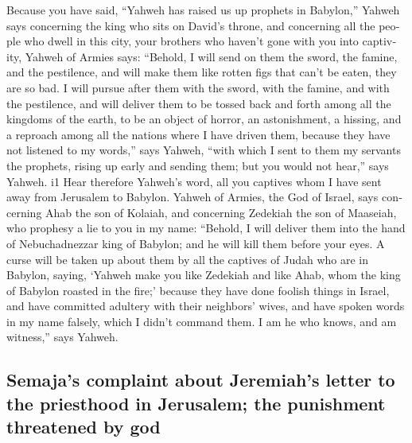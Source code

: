 \begin{paracol}{2}
\begin{otherlanguage}{english}
 Because you have said, ``Yahweh has raised us up
prophets in Babylon,''  Yahweh says concerning the king
who sits on David's throne, and concerning all the people who dwell in
this city, your brothers who haven't gone with you into captivity,
 Yahweh of Armies says: ``Behold, I will send on them the
sword, the famine, and the pestilence, and will make them like rotten
figs that can't be eaten, they are so bad.  I will pursue
after them with the sword, with the famine, and with the pestilence, and
will deliver them to be tossed back and forth among all the kingdoms of
the earth, to be an object of horror, an astonishment, a hissing, and a
reproach among all the nations where I have driven them, 
because they have not listened to my words,'' says Yahweh, ``with which
I sent to them my servants the prophets, rising up early and sending
them; but you would not hear,'' says Yahweh. i1  Hear
therefore Yahweh's word, all you captives whom I have sent away from
Jerusalem to Babylon.  Yahweh of Armies, the God of
Israel, says concerning Ahab the son of Kolaiah, and concerning Zedekiah
the son of Maaseiah, who prophesy a lie to you in my name: ``Behold, I
will deliver them into the hand of Nebuchadnezzar king of Babylon; and
he will kill them before your eyes.  A curse will be
taken up about them by all the captives of Judah who are in Babylon,
saying, `Yahweh make you like Zedekiah and like Ahab, whom the king of
Babylon roasted in the fire;'  because they have done
foolish things in Israel, and have committed adultery with their
neighbors' wives, and have spoken words in my name falsely, which I
didn't command them. I am he who knows, and am witness,'' says Yahweh.

\hypertarget{semajas-complaint-about-jeremiahs-letter-to-the-priesthood-in-jerusalem-the-punishment-threatened-by-god}{%
\subsection{Semaja's complaint about Jeremiah's letter to the priesthood
in Jerusalem; the punishment threatened by
god}\label{semajas-complaint-about-jeremiahs-letter-to-the-priesthood-in-jerusalem-the-punishment-threatened-by-god}}


\end{otherlanguage}
\end{paracol}
